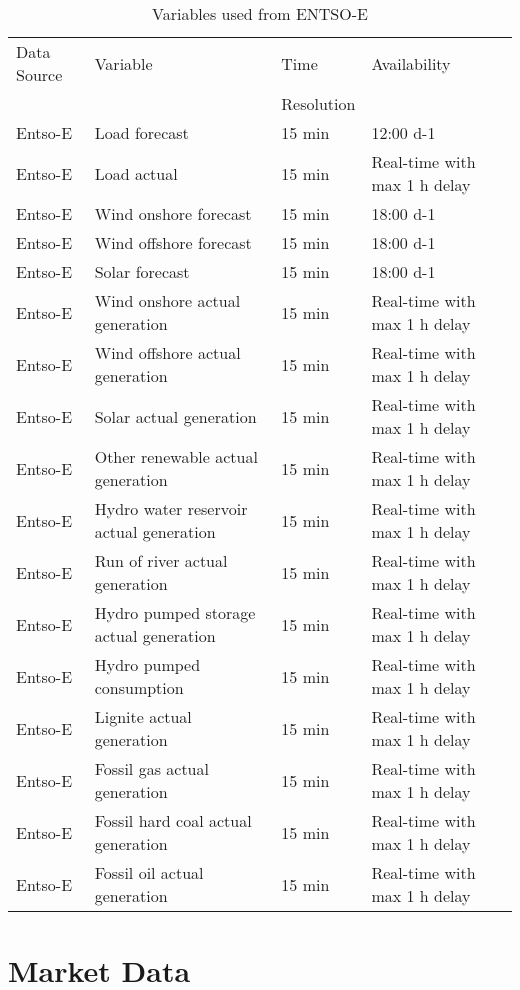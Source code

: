 \documentclass[class=scrbook, crop=false]{standalone}
\begin{document}
\begin{table}[]
\begin{tabular}{l|l|l|l}
 Data Source & Variable &  Time  & Availability  \\
 &&Resolution&\\\hline
 Entso-E & Load forecast & 15 min  & 12:00 d-1 \\
 Entso-E & Load actual & 15 min  & Real-time with max 1 h delay \\
 Entso-E & Wind onshore forecast & 15 min  & 18:00 d-1\\
 Entso-E & Wind offshore forecast & 15 min & 18:00 d-1 \\
 Entso-E & Solar forecast & 15 min & 18:00 d-1 \\
 Entso-E & Wind onshore actual generation & 15 min  & Real-time with max 1 h delay\\
 Entso-E & Wind offshore actual generation & 15 min & Real-time with max 1 h delay \\
 Entso-E & Solar actual generation & 15 min & Real-time with max 1 h delay \\
 Entso-E & Other renewable actual generation & 15 min & Real-time with max 1 h delay \\
 Entso-E & Hydro water reservoir actual generation & 15 min & Real-time with max 1 h delay \\
 Entso-E & Run of river actual generation & 15 min & Real-time with max 1 h delay \\
 Entso-E & Hydro pumped storage actual generation & 15 min & Real-time with max 1 h delay \\
 Entso-E & Hydro pumped consumption & 15 min & Real-time with max 1 h delay \\
 Entso-E & Lignite actual generation & 15 min & Real-time with max 1 h delay \\
 Entso-E & Fossil gas actual generation & 15 min & Real-time with max 1 h delay \\
 Entso-E & Fossil hard coal actual generation & 15 min & Real-time with max 1 h delay \\
 Entso-E & Fossil oil actual generation & 15 min & Real-time with max 1 h delay \\
  
\end{tabular}
\caption{Variables used from ENTSO-E}
\label{Table::Energy_Data_Entsoe}
\end{table}

\section{Market Data}
\label{Section::Market_Data}
\end{document}
